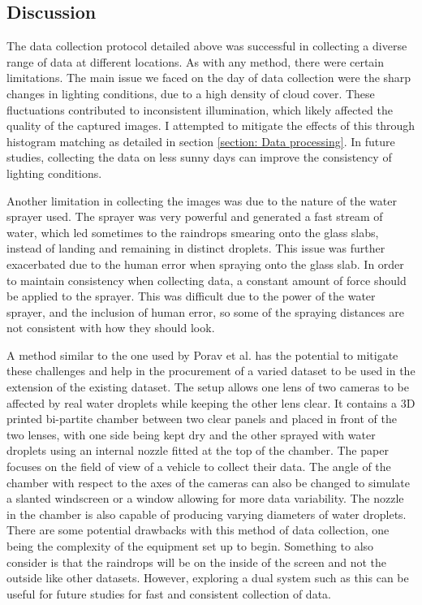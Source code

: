 \documentclass[11pt]{ociamthesis}  %
\begin{document}
\subsection{Discussion}

The data collection protocol detailed above was successful in collecting a diverse range of data at different locations. As with any method, there were certain limitations. The main issue we faced on the day of data collection were the sharp changes in lighting conditions, due to a high density of cloud cover. These fluctuations contributed to inconsistent illumination, which likely affected the quality of the captured images. I attempted to mitigate the effects of this through histogram matching as detailed in section \ref{section: Data processing}. In future studies, collecting the data on less sunny days can improve the consistency of lighting conditions.

Another limitation in collecting the images was due to the nature of the water sprayer used. The sprayer was very powerful and generated a fast stream of water, which led sometimes to the raindrops smearing onto the glass slabs, instead of landing and remaining in distinct droplets. This issue was further exacerbated due to the human error when spraying onto the glass slab. In order to maintain consistency when collecting data, a constant amount of force should be applied to the sprayer. This was difficult due to the power of the water sprayer, and the inclusion of human error, so some of the spraying distances are not consistent with how they should look.

A method similar to the one used by Porav et al. \cite{8793486} has the potential to mitigate these challenges and help in the procurement of a varied dataset to be used in the extension of the existing dataset. The setup allows one lens of two cameras to be affected by real water droplets while keeping the other lens clear. It contains a 3D printed bi-partite chamber between two clear panels and placed in front of the two lenses, with one side being kept dry and the other sprayed with water droplets using an internal nozzle fitted at the top of the chamber. The paper focuses on the field of view of a vehicle to collect their data. The angle of the chamber with respect to the axes of the cameras can also be changed to simulate a slanted windscreen or a window allowing for more data variability. The nozzle in the chamber is also capable of producing varying diameters of water droplets. There are some potential drawbacks with this method of data collection, one being the complexity of the equipment set up to begin. Something to also consider is that the raindrops will be on the inside of the screen and not the outside like other datasets. However, exploring a dual system such as this can be useful for future studies for fast and consistent collection of data.
\end{document}

